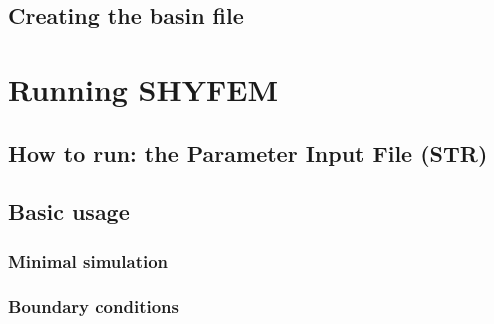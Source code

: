 \documentclass{report}
\newcommand{\todo}[1]{This section still has to be written by #1}
\begin{document}
	\section{Creating the basin file}
	


\chapter{Running SHYFEM}

	

	\section{How to run: the Parameter Input File (STR)}
	



	\section{Basic usage}

		

		\subsection{Minimal simulation}
		


		\subsection{Boundary conditions}
		

\end{document}
